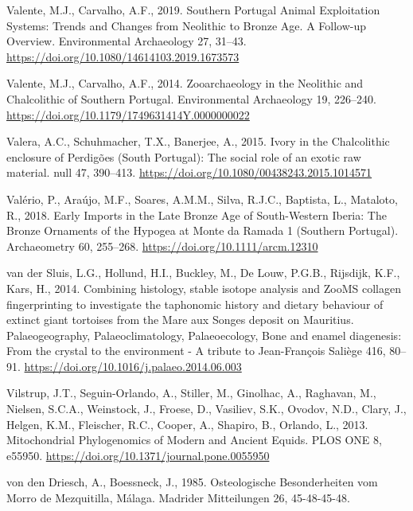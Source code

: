 \documentclass[preprint, 3p, authoryear]{elsarticle} %
\newlength{\cslhangindent}
\newlength{\cslentryspacingunit} %
\newenvironment{CSLReferences}[2] %
 {%
  \setlength{\parindent}{0pt}
  \ifodd #1
  \let\oldpar\par
  \def\par{\hangindent=\cslhangindent\oldpar}
  \fi
  \setlength{\parskip}{#2\cslentryspacingunit}
 }%
 {}
\begin{document}
\begin{CSLReferences}{1}{0}
\leavevmode{}%
Valente, M.J., Carvalho, A.F., 2019. Southern {Portugal Animal Exploitation Systems}: {Trends} and {Changes} from {Neolithic} to {Bronze Age}. {A Follow-up Overview}. Environmental Archaeology 27, 31--43. \url{https://doi.org/10.1080/14614103.2019.1673573}

\leavevmode{}%
Valente, M.J., Carvalho, A.F., 2014. Zooarchaeology in the {Neolithic} and {Chalcolithic} of {Southern Portugal}. Environmental Archaeology 19, 226--240. \url{https://doi.org/10.1179/1749631414Y.0000000022}

\leavevmode{}%
Valera, A.C., Schuhmacher, T.X., Banerjee, A., 2015. Ivory in the {Chalcolithic} enclosure of {Perdigões} ({South Portugal}): The social role of an exotic raw material. null 47, 390--413. \url{https://doi.org/10.1080/00438243.2015.1014571}

\leavevmode{}%
Valério, P., Araújo, M.F., Soares, A.M.M., Silva, R.J.C., Baptista, L., Mataloto, R., 2018. Early {Imports} in the {Late Bronze Age} of {South-Western Iberia}: {The Bronze Ornaments} of the {Hypogea} at {Monte} da {Ramada} 1 ({Southern Portugal}). Archaeometry 60, 255--268. \url{https://doi.org/10.1111/arcm.12310}

\leavevmode{}%
van der Sluis, L.G., Hollund, H.I., Buckley, M., De Louw, P.G.B., Rijsdijk, K.F., Kars, H., 2014. Combining histology, stable isotope analysis and {ZooMS} collagen fingerprinting to investigate the taphonomic history and dietary behaviour of extinct giant tortoises from the {Mare} aux {Songes} deposit on {Mauritius}. Palaeogeography, Palaeoclimatology, Palaeoecology, Bone and enamel diagenesis: {From} the crystal to the environment - {A} tribute to {Jean-François Saliège} 416, 80--91. \url{https://doi.org/10.1016/j.palaeo.2014.06.003}

\leavevmode{}%
Vilstrup, J.T., Seguin-Orlando, A., Stiller, M., Ginolhac, A., Raghavan, M., Nielsen, S.C.A., Weinstock, J., Froese, D., Vasiliev, S.K., Ovodov, N.D., Clary, J., Helgen, K.M., Fleischer, R.C., Cooper, A., Shapiro, B., Orlando, L., 2013. Mitochondrial {Phylogenomics} of {Modern} and {Ancient Equids}. PLOS ONE 8, e55950. \url{https://doi.org/10.1371/journal.pone.0055950}

\leavevmode{}%
von den Driesch, A., Boessneck, J., 1985. Osteologische {Besonderheiten} vom {Morro} de {Mezquitilla}, {Málaga}. Madrider Mitteilungen 26, 45-48-45-48.


\end{CSLReferences}
\end{document}
